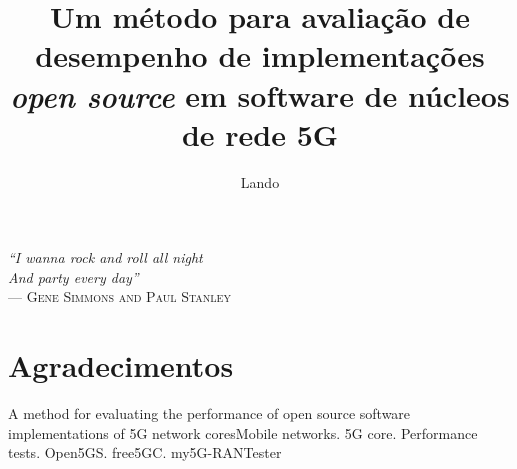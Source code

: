 \documentclass[ecp,tc]{iiufrgs}
\title{Um método para avaliação de desempenho de implementações \textit{open source} em software de núcleos de rede 5G}
\author{Lando}{Gabriel}
\begin{document}
\maketitle

\clearpage
\begin{flushright}
\mbox{}\vfill
{\sffamily\itshape
``I wanna rock and roll all night\\
And party every day''\\}
--- \textsc{Gene Simmons and Paul Stanley}
\end{flushright}

\chapter*{Agradecimentos}



\begin{abstract}

\end{abstract}

\begin{englishabstract}{A method for evaluating the performance of open source software implementations of 5G network cores}{Mobile networks. 5G core. Performance tests. Open5GS. free5GC. my5G-RANTester}

\end{englishabstract}
\end{document}
